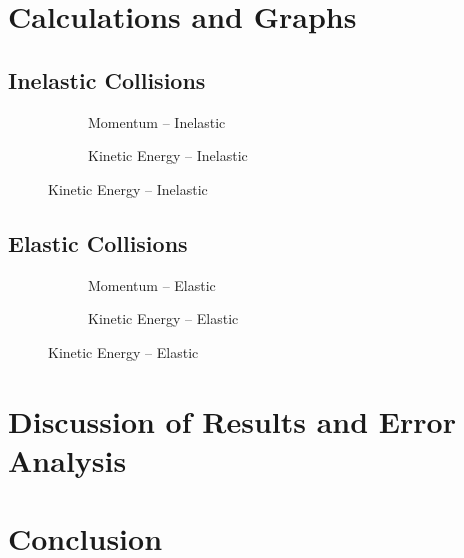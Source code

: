 \documentclass[12pt,letterpaper,titlepage]{report}
\begin{document}

\section*{Calculations and Graphs}
\captionsetup[subfigure]{labelformat=empty}

\subsection*{Inelastic Collisions}

\begin{figure}[H]
    \centering
    \begin{subfigure}[b]{0.49\textwidth}
        \centering
        \caption{Momentum -- Inelastic}
        
    \end{subfigure}
    \begin{subfigure}[b]{0.49\textwidth}
        \centering
        \caption{Kinetic Energy -- Inelastic}
        
    \end{subfigure}
\end{figure}

\subsection*{Elastic Collisions}

\begin{figure}[H]
    \centering
    \begin{subfigure}[b]{0.49\textwidth}
        \centering
        \caption{Momentum -- Elastic}
        
    \end{subfigure}
    \begin{subfigure}[b]{0.49\textwidth}
        \centering
        \caption{Kinetic Energy -- Elastic}
        
    \end{subfigure}
\end{figure}
    


\section*{Discussion of Results and Error Analysis}


\section*{Conclusion}
\end{document}
